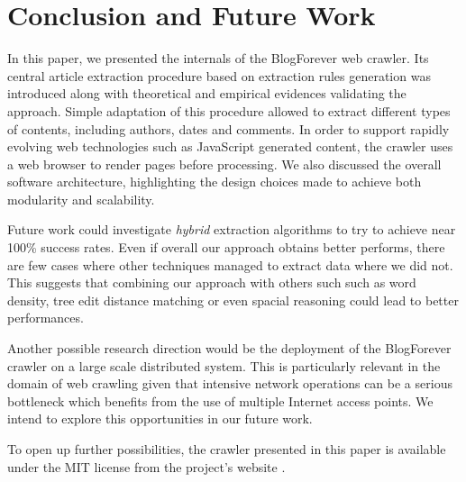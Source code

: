 \section{Conclusion and Future Work}
In this paper, we presented the internals of the BlogForever web crawler. Its central article extraction procedure based on extraction rules generation was introduced along with theoretical and empirical evidences validating the approach. Simple adaptation of this procedure allowed to extract different types of contents, including authors, dates and comments. In order to support rapidly evolving web technologies such as JavaScript generated content, the crawler uses a web browser to render pages before processing. We also discussed the overall software architecture, highlighting the design choices made to achieve both modularity and scalability.

Future work could investigate \emph{hybrid} extraction algorithms to try to achieve near 100\% success rates. Even if overall our approach obtains better performs, there are few cases where other techniques managed to extract data where we did not. This suggests that combining our approach with others such such as word density, tree edit distance matching or even spacial reasoning could lead to better performances.

Another possible research direction would be the deployment of the BlogForever crawler on a large scale distributed system. This is particularly relevant in the domain of web crawling given that intensive network operations can be a serious bottleneck which benefits from the use of multiple Internet access points. We intend to explore this opportunities in our future work.


To open up further possibilities, the crawler presented in this paper is available under the MIT license from the project's website \cite{blogforevercrawler}.
